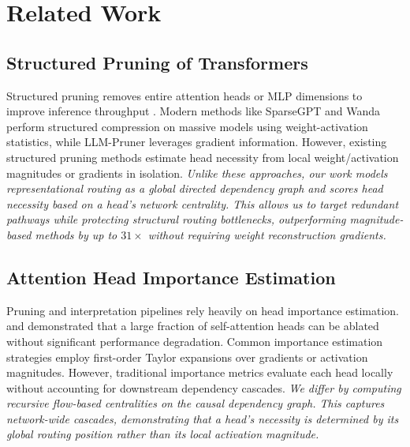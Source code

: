 \documentclass[11pt,a4paper]{article}
\theoremstyle{definition}
\theoremstyle{plain}
\begin{document}
\section{Related Work}
\label{sec:related}

\subsection{Structured Pruning of Transformers}
Structured pruning removes entire attention heads or MLP dimensions to improve inference throughput \citep{han2015learning, frankle2019lottery}. Modern methods like SparseGPT \citep{frantar2023sparsegpt} and Wanda \citep{sun2024wanda} perform structured compression on massive models using weight-activation statistics, while LLM-Pruner \citep{ma2023llmpruner} leverages gradient information. However, existing structured pruning methods estimate head necessity from local weight/activation magnitudes or gradients in isolation. \emph{Unlike these approaches, our work models representational routing as a global directed dependency graph and scores head necessity based on a head's network centrality. This allows us to target redundant pathways while protecting structural routing bottlenecks, outperforming magnitude-based methods by up to $31\times$ without requiring weight reconstruction gradients.}

\subsection{Attention Head Importance Estimation}
Pruning and interpretation pipelines rely heavily on head importance estimation. \citet{michel2019sixteen} and \citet{voita2019analyzing} demonstrated that a large fraction of self-attention heads can be ablated without significant performance degradation. Common importance estimation strategies employ first-order Taylor expansions over gradients \citep{molchanov2017taylor} or activation magnitudes. However, traditional importance metrics evaluate each head locally without accounting for downstream dependency cascades. \emph{We differ by computing recursive flow-based centralities on the causal dependency graph. This captures network-wide cascades, demonstrating that a head's necessity is determined by its global routing position rather than its local activation magnitude.}
\end{document}
